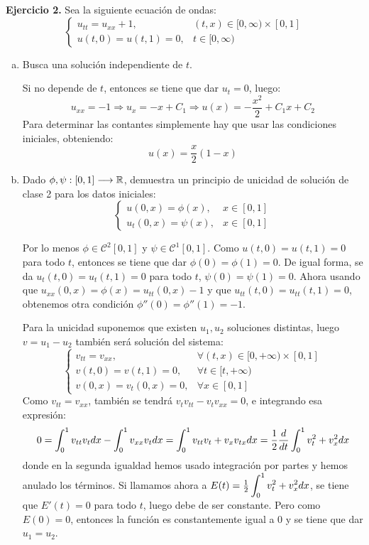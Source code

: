 \documentclass[12pt]{article}
\theoremstyle{definition}
\theoremstyle{remark}
\begin{document}
\textbf{Ejercicio 2. } Sea la siguiente ecuación de ondas:
\[
\left\{
\begin{array}{ll}
u_{tt}=u_{xx}+1, & (t,x)\in[0,\infty)\times[0,1]\\
u(t,0)=u(t,1)=0, & t\in[0,\infty)
\end{array}
\right.
\]
\begin{enumerate}[(a)]
\item Busca una solución independiente de $t$.

Si no depende de $t$, entonces se tiene que dar $u_t=0$, luego: 
\[
u_{xx}=-1 \Rightarrow u_x=-x+C_1\Rightarrow u(x)=-\frac{x^2}{2}+C_1x+C_2
\]
Para determinar las contantes simplemente hay que usar las condiciones iniciales, obteniendo:
\[
u(x)=\frac{x}{2}(1-x)
\]

\item Dado $\phi,\psi : [0,1] \longrightarrow \mathbb{R}$, demuestra un principio de unicidad de solución de clase 2 para los datos iniciales:
\[
\left\{
\begin{array}{ll}
u(0,x)=\phi(x), & x\in[0,1]\\
u_t(0,x)=\psi(x), & x\in[0,1]
\end{array}
\right.
\]

Por lo menos $\phi\in\mathcal{C}^2[0,1]$ y $\psi\in\mathcal{C}^1[0,1]$. Como $u(t,0)=u(t,1)=0$ para todo $t$, entonces se tiene que dar $\phi(0)=\phi(1)=0$. De igual forma, se da $u_t(t,0)=u_t(t,1)=0$ para todo $t$, $\psi(0)=\psi(1)=0$. Ahora usando que $u_{xx}(0,x)=\phi(x)=u_{tt}(0,x)-1$ y que $u_{tt}(t,0)=u_{tt}(t,1)=0$, obtenemos otra condición $\phi''(0)=\phi''(1)=-1$.

Para la unicidad suponemos que existen $u_1,u_2$ soluciones distintas, luego $v=u_1-u_2$ también será solución del sistema:
\[
\left\{
\begin{array}{ll}
v_{tt}=v_{xx}, & \forall (t,x)\in[0,+\infty)\times[0,1]\\
v(t,0)=v(t,1)=0, & \forall t\in[t,+\infty)\\
v(0,x)=v_t(0,x)=0, & \forall x\in[0,1] 
\end{array}
\right.
\]
Como $v_{tt}=v_{xx}$, también se tendrá $v_tv_{tt}-v_tv_{xx}=0$, e integrando esa expresión:
\[
0=\displaystyle\int_{ 0 }^{ 1 } v_{tt}v_tdx-\displaystyle\int_{ 0 }^{ 1 } v_{xx}v_tdx=
\displaystyle\int_{ 0 }^{ 1 } v_{tt}v_t+v_x v_{tx}dx=\frac{1}{2}\frac{d}{dt}\displaystyle\int_{ 0 }^{ 1 } v_t^2+v_x^2dx
\]
donde en la segunda igualdad hemos usado integración por partes y hemos anulado los términos. Si llamamos ahora a $E(t)=\frac{1}{2}\displaystyle\int_{ 0 }^{ 1 } v_t^2+v_x^2dx$, se tiene que $E'(t)=0$ para todo $t$, luego debe de ser constante. Pero como $E(0)=0$, entonces la función es constantemente igual a 0 y se tiene que dar $u_1=u_2$.



\end{enumerate}
\end{document}
